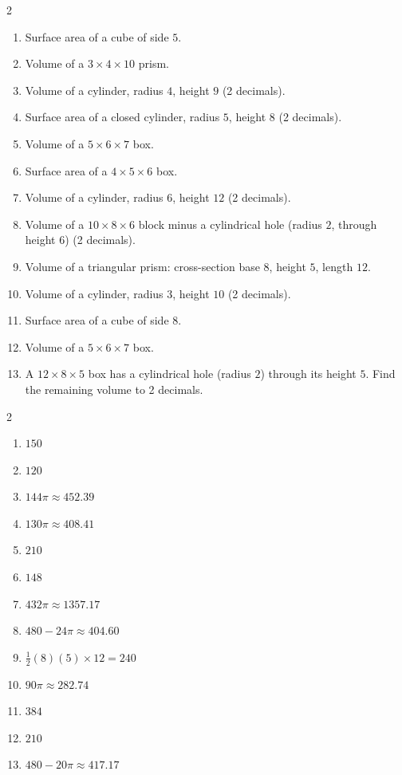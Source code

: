 \documentclass[11pt]{article}
\begin{document}
\begin{recapbox}
\begin{multicols}{2}
\small
\begin{enumerate}[leftmargin=*,itemsep=3pt]
  \item Surface area of a cube of side $5$.
  \item Volume of a $3\times4\times10$ prism.
  \item Volume of a cylinder, radius $4$, height $9$ (2 decimals).
  \item Surface area of a closed cylinder, radius $5$, height $8$ (2 decimals).
  \item Volume of a $5\times6\times7$ box.
  \item Surface area of a $4\times5\times6$ box.
  \item Volume of a cylinder, radius $6$, height $12$ (2 decimals).
  \item Volume of a $10\times8\times6$ block minus a cylindrical hole (radius $2$, through height $6$) (2 decimals).
  \item Volume of a triangular prism: cross-section base $8$, height $5$, length $12$.
  \item Volume of a cylinder, radius $3$, height $10$ (2 decimals).
  \item Surface area of a cube of side $8$.
  \item Volume of a $5\times6\times7$ box.
  \item A $12\times8\times5$ box has a cylindrical hole (radius $2$) through its height $5$. Find the remaining volume to 2 decimals.
\end{enumerate}
\end{multicols}
\end{recapbox}

\begin{keybox}
\begin{multicols}{2}
\small
\begin{enumerate}[leftmargin=*,itemsep=3pt]
  \item $150$
  \item $120$
  \item $144\pi\approx452.39$
  \item $130\pi\approx408.41$
  \item $210$
  \item $148$
  \item $432\pi\approx1357.17$
  \item $480-24\pi\approx404.60$
  \item $\tfrac12(8)(5)\times12=240$
  \item $90\pi\approx282.74$
  \item $384$
  \item $210$
  \item $480-20\pi\approx417.17$
\end{enumerate}
\end{multicols}
\end{keybox}
\end{document}
